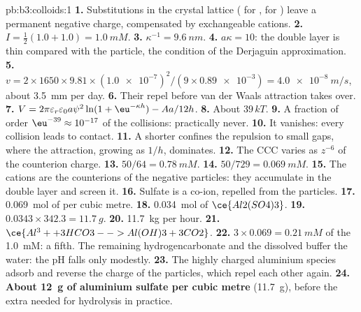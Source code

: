\begin{solution}{pb:b3:colloids:1}
\textbf{1.} Substitutions in the crystal lattice ( for ,  for ) leave
a permanent negative charge, compensated by exchangeable cations.
\textbf{2.} $I = \frac12(1.0 + 1.0) = \qty{1.0}{mM}$.
\textbf{3.} $\kappa^{-1} = \qty{9.6}{nm}$.
\textbf{4.} $a\kappa = 10$: the double layer is thin compared with the particle, the
condition of the Derjaguin approximation.
\textbf{5.} $v = 2 \times 1650 \times 9.81 \times (\num{1.0e-7})^2/(9 \times \num{0.89e-3}) = \qty{4.0e-8}{m/s}$, about \qty{3.5}{mm} per day.
\textbf{6.} Their  repel before van der Waals attraction takes over.
\textbf{7.} $V = 2\pi\varepsilon_r\varepsilon_0a\psi^2\ln(1 + \eu^{-\kappa h}) - Aa/12h$.
\textbf{8.} About $39\,kT$.
\textbf{9.} A fraction of order $\eu^{-39} \approx 10^{-17}$ of the collisions: practically never.
\textbf{10.} It vanishes: every collision leads to contact.
\textbf{11.} A shorter  confines the repulsion to small gaps, where the
attraction, growing as $1/h$, dominates.
\textbf{12.} The CCC varies as $z^{-6}$ of the counterion charge.
\textbf{13.} $50/64 = \qty{0.78}{mM}$.
\textbf{14.} $50/729 = \qty{0.069}{mM}$.
\textbf{15.} The cations are the counterions of the negative particles: they
accumulate in the double layer and screen it.
\textbf{16.} Sulfate is a co-ion, repelled from the particles.
\textbf{17.} \qty{0.069}{mol} of  per cubic metre.
\textbf{18.} \qty{0.034}{mol} of $\ce{Al2(SO4)3}$.
\textbf{19.} $0.0343 \times 342.3 = \qty{11.7}{g}$.
\textbf{20.} \qty{11.7}{kg} per hour.
\textbf{21.} $\ce{Al^3+ + 3 HCO3- -> Al(OH)3 + 3 CO2}$.
\textbf{22.} $3 \times 0.069 = \qty{0.21}{mM}$ of the \qty{1.0}{mM}: a fifth. The remaining
hydrogencarbonate and the dissolved  buffer the water: the pH falls only
modestly.
\textbf{23.} The highly charged aluminium species adsorb and reverse the charge of the
particles, which repel each other again.
\textbf{24.} \textbf{About \qty{12}{g} of aluminium sulfate per cubic metre} (\qty{11.7}{g}), before the extra
needed for hydrolysis in practice.
\end{solution}
